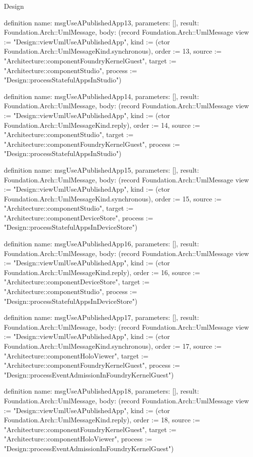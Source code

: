\begin{lexlean}{Design}
\begin{semanticmodule}
definition{
  name: msgUseAPublishedApp13,
  parameters: [],
  result: Foundation.Arch::UmlMessage,
  body: (record Foundation.Arch::UmlMessage {view := "Design::viewUmlUseAPublishedApp", kind := (ctor Foundation.Arch::UmlMessageKind.synchronous), order := 13, source := "Architecture::componentFoundryKernelGuest", target := "Architecture::componentStudio", process := "Design::processStatefulAppsInStudio"})
}

definition{
  name: msgUseAPublishedApp14,
  parameters: [],
  result: Foundation.Arch::UmlMessage,
  body: (record Foundation.Arch::UmlMessage {view := "Design::viewUmlUseAPublishedApp", kind := (ctor Foundation.Arch::UmlMessageKind.reply), order := 14, source := "Architecture::componentStudio", target := "Architecture::componentFoundryKernelGuest", process := "Design::processStatefulAppsInStudio"})
}

definition{
  name: msgUseAPublishedApp15,
  parameters: [],
  result: Foundation.Arch::UmlMessage,
  body: (record Foundation.Arch::UmlMessage {view := "Design::viewUmlUseAPublishedApp", kind := (ctor Foundation.Arch::UmlMessageKind.synchronous), order := 15, source := "Architecture::componentStudio", target := "Architecture::componentDeviceStore", process := "Design::processStatefulAppsInDeviceStore"})
}

definition{
  name: msgUseAPublishedApp16,
  parameters: [],
  result: Foundation.Arch::UmlMessage,
  body: (record Foundation.Arch::UmlMessage {view := "Design::viewUmlUseAPublishedApp", kind := (ctor Foundation.Arch::UmlMessageKind.reply), order := 16, source := "Architecture::componentDeviceStore", target := "Architecture::componentStudio", process := "Design::processStatefulAppsInDeviceStore"})
}

definition{
  name: msgUseAPublishedApp17,
  parameters: [],
  result: Foundation.Arch::UmlMessage,
  body: (record Foundation.Arch::UmlMessage {view := "Design::viewUmlUseAPublishedApp", kind := (ctor Foundation.Arch::UmlMessageKind.synchronous), order := 17, source := "Architecture::componentHoloViewer", target := "Architecture::componentFoundryKernelGuest", process := "Design::processEventAdmissionInFoundryKernelGuest"})
}

definition{
  name: msgUseAPublishedApp18,
  parameters: [],
  result: Foundation.Arch::UmlMessage,
  body: (record Foundation.Arch::UmlMessage {view := "Design::viewUmlUseAPublishedApp", kind := (ctor Foundation.Arch::UmlMessageKind.reply), order := 18, source := "Architecture::componentFoundryKernelGuest", target := "Architecture::componentHoloViewer", process := "Design::processEventAdmissionInFoundryKernelGuest"})
}


\end{semanticmodule}
\end{lexlean}
